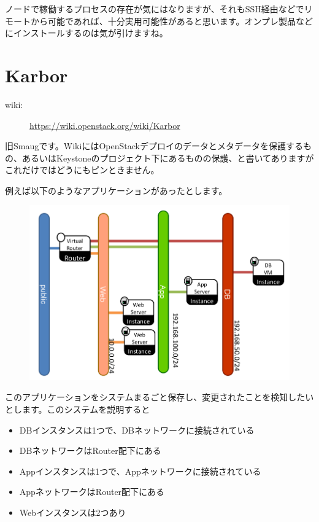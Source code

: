 ノードで稼働するプロセスの存在が気にはなりますが、それもSSH経由などでリモートから可能であれば、十分実用可能性があると思います。オンプレ製品などにインストールするのは気が引けますね。

\section{Karbor}

\begin{description}
	\item[wiki:] \url{https://wiki.openstack.org/wiki/Karbor}
\end{description}

旧Smaugです。WikiにはOpenStackデプロイのデータとメタデータを保護するもの、あるいはKeystoneのプロジェクト下にあるものの保護、と書いてありますがこれだけではどうにもピンときません。

例えば以下のようなアプリケーションがあったとします。

\begin{figure}[htb]
	\begin{center}
		\includegraphics[width=\textwidth]{img/Smaug-sample-application.png}
	\end{center}
\end{figure}

このアプリケーションをシステムまるごと保存し、変更されたことを検知したいとします。このシステムを説明すると

\begin{itemize}
	\item DBインスタンスは1つで、DBネットワークに接続されている
	\item DBネットワークはRouter配下にある
	\item Appインスタンスは1つで、Appネットワークに接続されている
	\item AppネットワークはRouter配下にある
	\item Webインスタンスは2つあり
\end{itemize}

